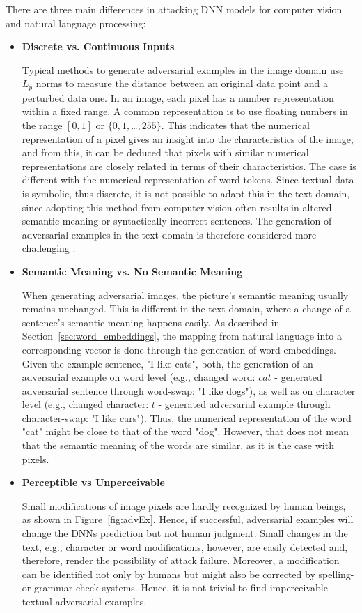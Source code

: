 There are three main differences in attacking DNN models for computer vision and natural language processing:
\begin{itemize}
\item\textbf{Discrete vs. Continuous Inputs}

Typical methods to generate adversarial examples in the image domain use $L_p$ norms to measure the distance between an original data point and a perturbed data one. 
In an image, each pixel has a number representation within a fixed range. A common representation is to use floating numbers in the range ${[0,1]}$ or ${\{0,1,}$\dots${,255\}}$. This indicates that the numerical representation of a pixel gives an insight into the characteristics of the image, and from this, it can be deduced that pixels with similar numerical representations are closely related in terms of their characteristics. The case is different with the numerical representation of word tokens.
Since textual data is symbolic, thus discrete, it is not possible to adapt this in the text-domain, since adopting this method from computer vision often results in altered semantic meaning or syntactically-incorrect sentences. The generation of adversarial examples in the text-domain is therefore considered more challenging \cite{carlini2018audio}.

\item\textbf{Semantic Meaning vs. No Semantic Meaning}

When generating adversarial images, the picture's semantic meaning usually remains unchanged. This is different in the text domain, where a change of a sentence's semantic meaning happens easily. As described in Section~\ref{sec:word_embeddings}, the mapping from natural language into a corresponding vector is done through the generation of word embeddings.
Given the example sentence, "I like cats", both, the generation of an adversarial example on word level (e.g., changed word: $cat$ - generated adversarial sentence through word-swap: "I like dogs"), as well as on character level (e.g., changed character: $t$ - generated adversarial example through character-swap: "I like cars"). Thus, the numerical representation of the word "cat" might be close to that of the word "dog".
However, that does not mean that the semantic meaning of the words are similar, as it is the case with pixels.


\item\textbf{Perceptible vs Unperceivable}

Small modifications of image pixels are hardly recognized by human beings, as shown in Figure~\ref{fig:advEx}. Hence, if successful, adversarial examples will change the DNNs prediction but not human judgment. Small changes in the text, e.g., character or word modifications, however, are easily detected and, therefore, render the possibility of attack failure. Moreover, a modification can be identified not only by humans but might also be corrected by spelling- or grammar-check systems. Hence, it is not trivial to find imperceivable textual adversarial examples.

\end{itemize}
